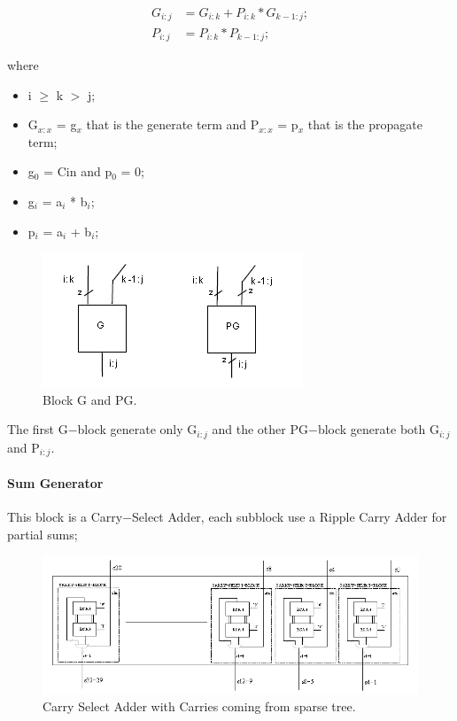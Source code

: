 \begin{align}
	G_{i:j} &= G_{i:k} + P_{i:k} * G_{k-1:j};\\
	P_{i:j} &= P_{i:k} * P_{k-1:j};
\label{General P and G}
\end{align}
	
where

\begin{itemize}
\item  i $\ge$ k $>$ j;
\item G$_{x:x}$ = g$_{x}$ that is the generate term and P$_{x:x}$ = p$_{x}$ that is the propagate term;
\item g$_{0}$ = Cin and p$_{0}$ = 0;
\item g$_{i}$ = a$_{i}$ * b$_{i}$;
\item p$_{i}$ = a$_{i}$ + b$_{i}$;
\end{itemize}

\begin{figure}[h]
\centering
\includegraphics[scale = 0.5]{chapters/figures/ppgblocks} 
\caption{Block G and PG.}
\label{fig:gpgblocks}  %
\end{figure}

The first G$-$block generate only G$_{i:j}$ and the other PG$-$block generate both G$_{i:j}$ and P$_{i:j}$.

\paragraph{Sum Generator}

This block is a Carry$-$Select Adder, each subblock use a Ripple Carry Adder for partial sums; 

\begin{figure}[h]
\centering
\includegraphics[scale = 0.7]{chapters/figures/sumgen} 
\caption{Carry Select Adder with Carries coming from sparse tree.}
\label{fig:sumgen}  %
\end{figure}

